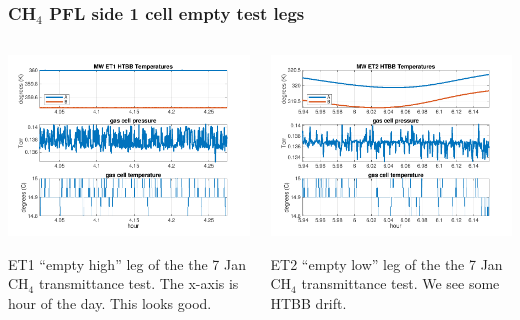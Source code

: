 \documentclass[10pt]{beamer}
\begin{document}
\begin{frame}
\frametitle{CH$_4$ PFL side 1 cell empty test legs}
\begin{columns}[t]
\begin{column}{0.5\textwidth}
  \begin{centering}
  \includegraphics[width=\textwidth]{harvest_01-07/01-07_MW_ET1.png}
  \end{centering}\vspace{3mm}

  ET1 ``empty high'' leg of the the 7 Jan CH$_4$ transmittance test.
  The x-axis is hour of the day.  This looks good.

\end{column}
\begin{column}{0.5\textwidth}  
  \begin{centering}
  \includegraphics[width=\textwidth]{harvest_01-07/01-07_MW_ET2.png}
  \end{centering}\vspace{3mm}

  ET2 ``empty low'' leg of the the 7 Jan CH$_4$ transmittance test.
  We see some HTBB drift.

\end{column}
\end{columns}
\end{frame}
\end{document}

